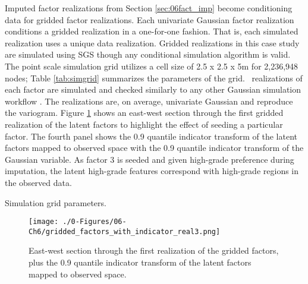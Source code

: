 Imputed factor realizations from Section \ref{sec:06fact_imp} become conditioning data for gridded factor realizations. Each univariate Gaussian factor realization conditions a gridded realization in a one-for-one fashion. That is, each simulated realization uses a unique data realization. Gridded realizations in this case study are simulated using \gls{SGS} though any conditional simulation algorithm is valid. The point scale simulation grid utilizes a cell size of 2.5 x 2.5 x 5m for 2,236,948 nodes; Table \ref{tab:simgrid} summarizes the parameters of the grid. \csnreals \ realizations of each factor are simulated and checked similarly to any other Gaussian simulation workflow \citep{leuangthong2004minimum}. The realizations are, on average, univariate Gaussian and reproduce the variogram. Figure \ref{fig:gridded_factors_with_indicator_real1} shows an east-west section through the first gridded realization of the latent factors to highlight the effect of seeding a particular factor. The fourth panel shows the 0.9 quantile indicator transform of the latent factors mapped to observed space with the 0.9 quantile indicator transform of the Gaussian variable. As factor 3 is seeded and given high-grade preference during imputation, the latent high-grade features correspond with high-grade regions in the observed data.

\begin{table}[!htb]
    \centering
    \caption{Simulation grid parameters.}
    \resizebox{0.9\width}{!}{}
    \label{tab:simgrid}
\end{table}

\begin{figure}[htb!]
    \centering
    \texttt{[image: ./0-Figures/06-Ch6/gridded\_factors\_with\_indicator\_real3.png]}
    \caption{East-west section through the first realization of the gridded factors, plus the 0.9 quantile indicator transform of the latent factors mapped to observed space.}
    \label{fig:gridded_factors_with_indicator_real1}
\end{figure}

